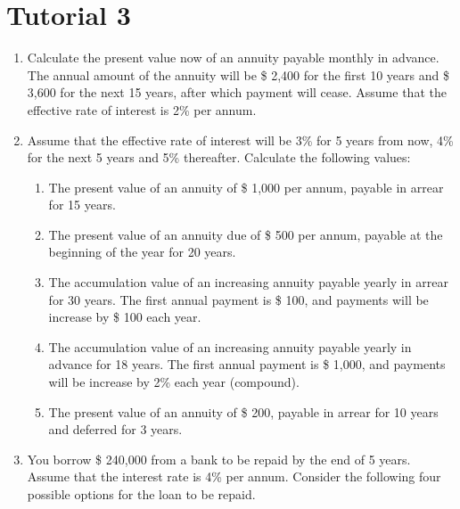 \documentclass[
]{article}
\theoremstyle{definition}
\theoremstyle{definition}
\theoremstyle{definition}
\theoremstyle{definition}
\theoremstyle{remark}
\begin{document}
\hypertarget{tutorial-3}{%
\section{Tutorial 3}\label{tutorial-3}}

\begin{enumerate}
\def\labelenumi{\arabic{enumi}.}
\item
  Calculate the present value now of an annuity payable monthly in
  advance. The annual amount of the annuity will be \$ 2,400 for the
  first 10 years and \$ 3,600 for the next 15 years, after which
  payment will cease. Assume that the effective rate of interest is 2\%
  per annum.
\item
  Assume that the effective rate of interest will be 3\% for 5 years
  from now, 4\% for the next 5 years and 5\% thereafter. Calculate the
  following values:

  \begin{enumerate}
  \def\labelenumii{\arabic{enumii}.}
  \item
    The present value of an annuity of \$ 1,000 per annum, payable
    in arrear for 15 years.
  \item
    The present value of an annuity due of \$ 500 per annum, payable
    at the beginning of the year for 20 years.
  \item
    The accumulation value of an increasing annuity payable yearly
    in arrear for 30 years. The first annual payment is \$ 100, and
    payments will be increase by \$ 100 each year.
  \item
    The accumulation value of an increasing annuity payable yearly
    in advance for 18 years. The first annual payment is \$ 1,000,
    and payments will be increase by 2\% each year (compound).
  \item
    The present value of an annuity of \$ 200, payable in arrear for
    10 years and deferred for 3 years.
  \end{enumerate}
\item
  You borrow \$ 240,000 from a bank to be repaid by the end of 5
  years. Assume that the interest rate is 4\% per annum. Consider the
  following four possible options for the loan to be repaid.


\end{enumerate}
\end{document}
